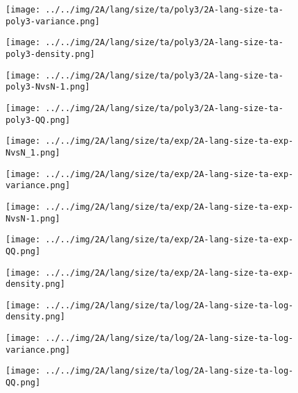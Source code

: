 \begin{figure}[H]
\centering	\texttt{[image: ../../img/2A/lang/size/ta/poly3/2A-lang-size-ta-poly3-variance.png]}
\end{figure}
\begin{figure}[H]
\centering	\texttt{[image: ../../img/2A/lang/size/ta/poly3/2A-lang-size-ta-poly3-density.png]}
\end{figure}
\begin{figure}[H]
\centering	\texttt{[image: ../../img/2A/lang/size/ta/poly3/2A-lang-size-ta-poly3-NvsN-1.png]}
\end{figure}
\begin{figure}[H]
\centering	\texttt{[image: ../../img/2A/lang/size/ta/poly3/2A-lang-size-ta-poly3-QQ.png]}
\end{figure}
\begin{figure}[H]
\centering	\texttt{[image: ../../img/2A/lang/size/ta/exp/2A-lang-size-ta-exp-NvsN\_1.png]}
\end{figure}
\begin{figure}[H]
\centering	\texttt{[image: ../../img/2A/lang/size/ta/exp/2A-lang-size-ta-exp-variance.png]}
\end{figure}
\begin{figure}[H]
\centering	\texttt{[image: ../../img/2A/lang/size/ta/exp/2A-lang-size-ta-exp-NvsN-1.png]}
\end{figure}
\begin{figure}[H]
\centering	\texttt{[image: ../../img/2A/lang/size/ta/exp/2A-lang-size-ta-exp-QQ.png]}
\end{figure}
\begin{figure}[H]
\centering	\texttt{[image: ../../img/2A/lang/size/ta/exp/2A-lang-size-ta-exp-density.png]}
\end{figure}
\begin{figure}[H]
\centering	\texttt{[image: ../../img/2A/lang/size/ta/log/2A-lang-size-ta-log-density.png]}
\end{figure}
\begin{figure}[H]
\centering	\texttt{[image: ../../img/2A/lang/size/ta/log/2A-lang-size-ta-log-variance.png]}
\end{figure}
\begin{figure}[H]
\centering	\texttt{[image: ../../img/2A/lang/size/ta/log/2A-lang-size-ta-log-QQ.png]}
\end{figure}
